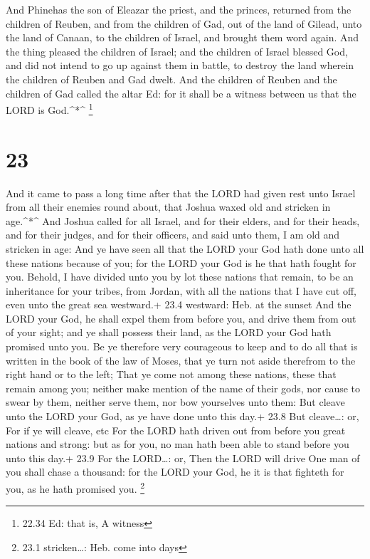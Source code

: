  And Phinehas the son of Eleazar the priest, and the
princes, returned from the children of Reuben, and from the children of
Gad, out of the land of Gilead, unto the land of Canaan, to the children
of Israel, and brought them word again.  And the thing
pleased the children of Israel; and the children of Israel blessed God,
and did not intend to go up against them in battle, to destroy the land
wherein the children of Reuben and Gad dwelt.  And the
children of Reuben and the children of Gad called the altar Ed: for it
shall be a witness between us that the LORD is God.\^{}*\^{} \footnote{22.34
  Ed: that is, A witness}

\hypertarget{section-22}{%
\section{23}\label{section-22}}

 And it came to pass a long time after that the LORD had
given rest unto Israel from all their enemies round about, that Joshua
waxed old and stricken in age.\^{}*\^{}  And Joshua called
for all Israel, and for their elders, and for their heads, and for their
judges, and for their officers, and said unto them, I am old and
stricken in age:  And ye have seen all that the LORD your
God hath done unto all these nations because of you; for the LORD your
God is he that hath fought for you.  Behold, I have divided
unto you by lot these nations that remain, to be an inheritance for your
tribes, from Jordan, with all the nations that I have cut off, even unto
the great sea westward.+ 23.4 westward: Heb. at the sunset 
And the LORD your God, he shall expel them from before you, and drive
them from out of your sight; and ye shall possess their land, as the
LORD your God hath promised unto you.  Be ye therefore very
courageous to keep and to do all that is written in the book of the law
of Moses, that ye turn not aside therefrom to the right hand or to the
left;  That ye come not among these nations, these that
remain among you; neither make mention of the name of their gods, nor
cause to swear by them, neither serve them, nor bow yourselves unto
them:  But cleave unto the LORD your God, as ye have done
unto this day.+ 23.8 But cleave\ldots: or, For if ye will cleave, etc
 For the LORD hath driven out from before you great nations
and strong: but as for you, no man hath been able to stand before you
unto this day.+ 23.9 For the LORD\ldots: or, Then the LORD will drive
 One man of you shall chase a thousand: for the LORD your
God, he it is that fighteth for you, as he hath promised you.
\footnote{23.1 stricken\ldots: Heb. come into days}


